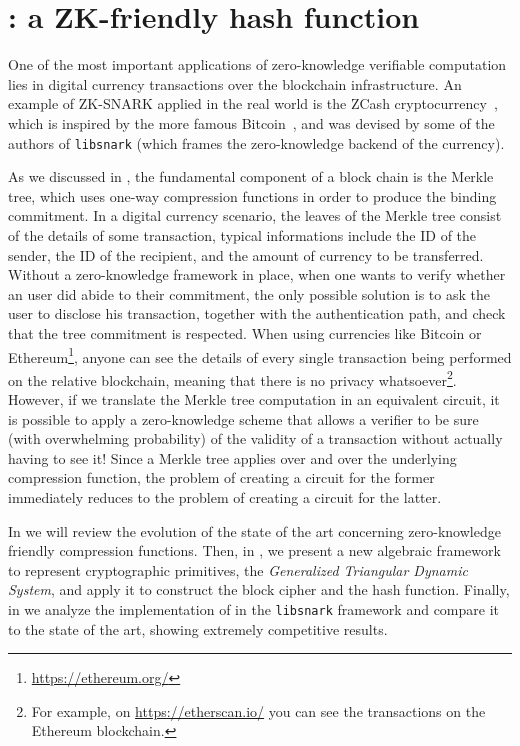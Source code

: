 \chapter{\ArionHash{}: a ZK-friendly hash function}\label{chap:arion}

One of the most important applications of zero-knowledge verifiable computation lies in digital 
currency transactions over the blockchain infrastructure.
An example of ZK-SNARK applied in the real world is the ZCash cryptocurrency~\cite{SassonCGGMTV2014}, 
which is inspired by the more famous Bitcoin~\cite{NarayananBFMG2016}, and was devised by some of 
the authors of \texttt{libsnark} (which frames the zero-knowledge backend of the currency).

As we discussed in , the fundamental component of a block chain is the 
Merkle tree, which uses one-way compression functions in order to produce the binding 
commitment.
In a digital currency scenario, the leaves of the Merkle tree consist of the details of some 
transaction, typical informations include the ID of the sender, the ID of the recipient, and the 
amount of currency to be transferred. 
Without a zero-knowledge framework in place, when one wants to verify whether an user did abide to 
their commitment, the only possible solution is to ask the user to disclose his transaction, 
together with the authentication path, and check that the tree commitment is respected. 
When using currencies like Bitcoin or Ethereum\footnote{\url{https://ethereum.org/}}, anyone 
can see the details of every single transaction being performed on the relative 
blockchain, meaning that there is no privacy whatsoever\footnote{For example, on 
\url{https://etherscan.io/} you can see the transactions on the Ethereum blockchain. %
}.
However, if we translate the Merkle tree computation in an equivalent circuit, it is possible to 
apply a zero-knowledge scheme that allows a verifier to be sure (with overwhelming probability) 
of the validity of a transaction without actually having to see it!
Since a Merkle tree applies over and over the underlying compression function, the problem of 
creating a circuit for the former immediately reduces to the problem of creating a circuit for the 
latter.

In  we will review the evolution of the state of the art concerning zero-knowledge 
friendly compression functions.
Then, in , we present a new algebraic framework to represent cryptographic 
primitives, the \emph{Generalized Triangular Dynamic System}, and apply it to construct the 
\Arion{} block cipher and the \ArionHash{} hash function.
Finally, in  we analyze the implementation of \ArionHash{} in the \texttt{libsnark}
framework and compare it to the state of the art, showing extremely competitive results.



